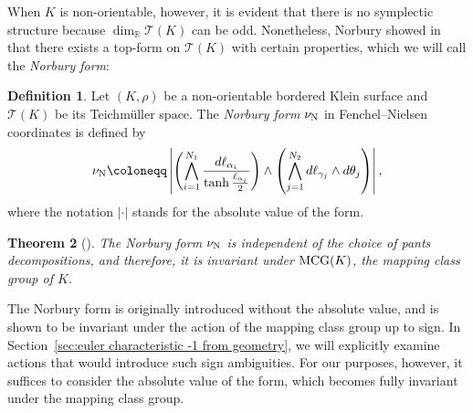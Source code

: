 \documentclass[12pt]{amsart}
\theoremstyle{plain}
\newtheorem{theorem}{Theorem}[section]
\theoremstyle{definition}
\newtheorem{definition}[theorem]{Definition}
\theoremstyle{remark}
\numberwithin{equation}{section}
\begin{document}
When $K$ is non-orientable, however, it is evident that there is no symplectic structure because $\dim_\mathbb{R}\mathcal{T}(K)$ can be odd. Nonetheless, Norbury showed in \cite{Nor07} that there exists a top-form on $\mathcal{T}(K)$ with certain properties, which we will call the \emph{Norbury form}:

\begin{definition}\label{def:nu}
    Let $(K,\rho)$ be a non-orientable bordered Klein surface and $\mathcal{T}(K)$ be its Teichm\"{u}ller space. The \emph{Norbury form} $\nu_{{\rm N}}$ in Fenchel--Nielsen coordinates is defined by
    \begin{equation}\label{eq:NorbForm}
\nu_{{\rm N}}\coloneqq\left|\left(\bigwedge_{i=1}^{N_1}\frac{d\ell_{\alpha_i}}{\tanh\frac{\ell_{\alpha_i}}{2}}\right)\wedge\left(\bigwedge_{j=1}^{N_2} d\ell_{\gamma_j}\wedge d\theta_j\right)\right|,
\end{equation}
where the notation $\left|\cdot\right|$ stands for the absolute value of the form.
\end{definition}

\begin{theorem}[\cite{Nor07}]\label{thm:Nor07}
The Norbury form $\nu_{{\rm N}}$ is independent of the choice of pants decompositions, and therefore, it is invariant under ${\rm MCG}(K)$, the mapping class group of $K$.
\end{theorem}

The Norbury form is originally introduced without the absolute value, and is shown to be invariant under the action of the mapping class group up to sign. In Section~\ref{sec:euler characteristic -1 from geometry}, we will explicitly examine actions that would introduce such sign ambiguities. For our purposes, however, it suffices to consider the absolute value of the form, which becomes fully invariant under the mapping class group.


\end{document}
